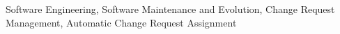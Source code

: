\lipsum[1-4]

\begin{keywords}
Software Engineering, Software Maintenance and Evolution, Change Request
Management, Automatic Change Request Assignment
\end{keywords}
